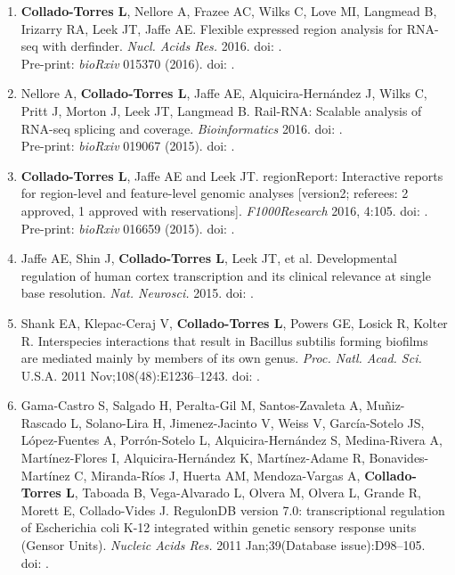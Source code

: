 \begin{enumerate}
        \item \textbf{Collado-Torres L}, Nellore A, Frazee AC, Wilks C, Love MI, Langmead B, Irizarry RA, Leek JT, Jaffe AE. Flexible expressed region analysis for RNA-seq with derfinder. \emph{Nucl. Acids Res.} 2016. doi: .
        \\ Pre-print: \emph{bioRxiv} 015370 (2016). doi: .
        
        \item Nellore A, \textbf{Collado-Torres L}, Jaffe AE, Alquicira-Hernández J, Wilks C, Pritt J, Morton J, Leek JT, Langmead B. Rail-RNA: Scalable analysis of RNA-seq splicing and coverage. \emph{Bioinformatics} 2016. doi: .
        \\ Pre-print: \emph{bioRxiv} 019067 (2015). doi: .
        
        \item \textbf{Collado-Torres L}, Jaffe AE and Leek JT. regionReport: Interactive reports for region-level and feature-level genomic analyses [version2; referees: 2 approved, 1 approved with reservations]. \emph{F1000Research} 2016, 4:105. doi: .
        \\ Pre-print: \emph{bioRxiv} 016659 (2015). doi: .
        
        \item Jaffe AE, Shin J, \textbf{Collado-Torres L}, Leek JT, et al. Developmental regulation of human cortex transcription and its clinical relevance at single base resolution. \emph{Nat. Neurosci.} 2015. doi: .
        
        \item Shank EA, Klepac-Ceraj V, \textbf{Collado-Torres L}, Powers GE, Losick R, Kolter R. Interspecies interactions that result in Bacillus subtilis forming biofilms are mediated mainly by members of its own genus. \emph{Proc. Natl. Acad. Sci.} U.S.A. 2011 Nov;108(48):E1236–1243. doi: .
        
        \item Gama-Castro S, Salgado H, Peralta-Gil M, Santos-Zavaleta A, Muñiz-Rascado L, Solano-Lira H, Jimenez-Jacinto V, Weiss V, Garc\'ia-Sotelo JS, L\'opez-Fuentes A, Porr\'on-Sotelo L, Alquicira-Hern\'andez S, Medina-Rivera A, Mart\'inez-Flores I, Alquicira-Hern\'andez K, Mart\'inez-Adame R, Bonavides-Mart\'inez C, Miranda-R\'ios J, Huerta AM, Mendoza-Vargas A, \textbf{Collado-Torres L}, Taboada B, Vega-Alvarado L, Olvera M, Olvera L, Grande R, Morett E, Collado-Vides J. RegulonDB version 7.0: transcriptional regulation of Escherichia coli K-12 integrated within genetic sensory response units (Gensor Units). \emph{Nucleic Acids Res.} 2011 Jan;39(Database issue):D98–105. doi: .
    \end{enumerate}
